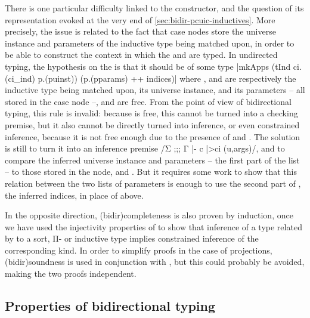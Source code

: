 There is one particular difficulty linked to the  constructor, and the question
of its representation evoked at the very end of \cref{sec:bidir-pcuic-inductives}.
More precisely, the issue is related to the fact that case nodes store the universe
instance and parameters of the inductive type being matched upon, in order to be able to
construct the context in which the  and  are typed.
In undirected typing, the hypothesis on the  is that it should be of some type
\coqline|mkApps (tInd ci.(ci_ind) p.(puinst)) (p.(pparams) ++ indices)|
where ,  and 
are respectively the inductive type being matched upon, its universe instance, and its
parameters – all stored in the case node –, and 
are free. From the point of view of bidirectional typing, this rule is invalid:%
%
because  is free, this cannot be turned into a checking premise, but it also
cannot be directly turned into inference, or even constrained inference, because it is
not free enough due to the presence of  and .
The solution is still to turn it into an inference premise
\coqe/Σ ;;; Γ |- c |>{ci} (u,args)/, and to compare the inferred universe instance 
and parameters – the first part of the list  – to those stored in the node, \eg
{} and . But it requires some work to
show that this relation between the two lists of parameters is enough to use the second part
of , the inferred indices, in place of  above.

In the opposite direction, \kl(bidir){completeness}%
is also proven by induction, once we have used
the injectivity properties of  to show that
inference of a type related by  to a sort, Π- or inductive type implies
constrained inference of the corresponding kind.
In order to simplify proofs in the case of projections,
\kl(bidir){soundness} is used in conjunction
with , but this could probably be avoided, making the two proofs independent.

\subsection{Properties of bidirectional typing}

